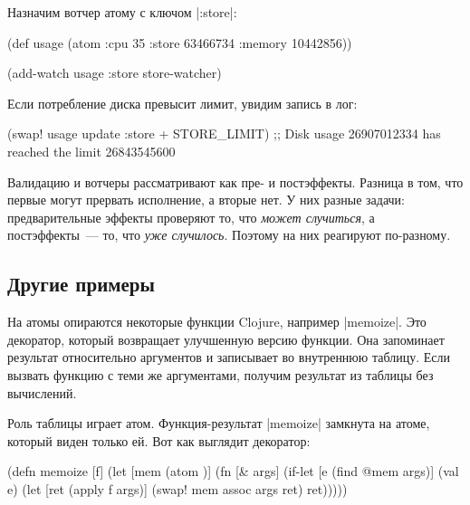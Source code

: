 Назначим вотчер атому с ключом \spverb|:store|:

\begin{english}
  \begin{clojure}
(def usage
  (atom {:cpu 35
         :store 63466734
         :memory 10442856}))

(add-watch usage :store store-watcher)
  \end{clojure}
\end{english}

\noindent
Если потребление диска превысит лимит, увидим запись в лог:

\begin{english}
  \begin{clojure}
(swap! usage update :store + STORE_LIMIT)
;; Disk usage 26907012334 has reached the limit 26843545600
  \end{clojure}
\end{english}

Валидацию и вотчеры рассматривают как пре- и постэффекты. Разница в том, что
первые могут прервать исполнение, а вторые нет. У них разные задачи:
предварительные эффекты проверяют то, что \emph{может случиться}, а
постэффекты~--- то, что \emph{уже случилось}. Поэтому на них реагируют
по-разному.

\subsection{Другие примеры}


На атомы опираются некоторые функции Clojure, например \spverb|memoize|. Это
декоратор, который возвращает улучшенную версию функции. Она запоминает
результат относительно аргументов и записывает во внутреннюю таблицу. Если
вызвать функцию с теми же аргументами, получим результат из таблицы без
вычислений.

Роль таблицы играет атом. Функция-результат \spverb|memoize| замкнута на атоме,
который виден только ей. Вот как выглядит декоратор:

\begin{english}
  \begin{clojure}
(defn memoize [f]
  (let [mem (atom {})]
    (fn [& args]
      (if-let [e (find @mem args)]
        (val e)
        (let [ret (apply f args)]
          (swap! mem assoc args ret)
          ret)))))
  \end{clojure}
\end{english}

